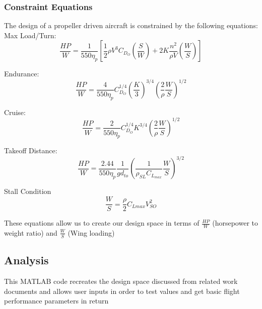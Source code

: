 \documentclass[]{article}
\begin{document}
\subsubsection{Constraint Equations} 

The design of a propeller driven aircraft is constrained by the following equations: \\

Max Load/Turn:
\begin{equation}
\frac{HP}{W}= \frac{1}{550\eta_{p}}[\frac{1}{2}\rho V^{3} C_{D_{O}} (\frac{S}{W}) + 2K \frac{n^2}{\rho V} (\frac{W}{S})]
\end{equation}

Endurance:
\begin{equation}
\frac{HP}{W}=\frac{4}{550\eta_{p}} C_{D_{O}}^{1/4} (\frac{K}{3})^{3/4} (\frac{2}{\rho} \frac{W}{S})^{1/2}
\end{equation}

Cruise:
\begin{equation}
\frac{HP}{W}=\frac{2}{550\eta_{p}} C_{D_{O}}^{1/4} K^{3/4} (\frac{2}{\rho} \frac{W}{S})^{1/2}
\end{equation}

Takeoff Distance:
\begin{equation}
\frac{HP}{W}=\frac{2.44}{550\eta_{p}} \frac{1}{gd_{to}}(\frac{1}{\rho_{SL} C_{L_{max}}} \frac{W}{S})^{3/2}
\end{equation}

Stall Condition
\begin{equation}
\frac{W}{S}= \frac{\rho}{2} C_{L{max}} V_{SO}^2
\end{equation}

\noindent These equations allow us to create our design space in terms of $\frac{HP}{W}$ (horsepower to weight ratio) and $\frac{W}{S}$ (Wing loading)
%
%








\subsection{Analysis}
This MATLAB code recreates the design space discussed from related work documents and allows user inputs in order to test values and get basic flight performance parameters in return

 
\end{document}

